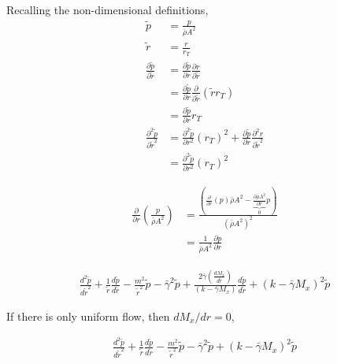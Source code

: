 \documentclass[a4paper]{report}
\begin{document}
Recalling the non-dimensional definitions,
\begin{align*}
    \tilde{p} &= \frac{p}{\bar{\rho} A^2} \\
    \tilde{r} &= \frac{r}{r_T} \\
    \frac{\partial \tilde{p}}{\partial \tilde{r}} &= 
    \frac{ \partial \tilde{p}}{\partial r} \frac{\partial r}{ \partial \tilde{r}}  \\ 
    &= \frac{ \partial \tilde{p}}{\partial r} \frac{\partial }{ \partial \tilde{r}} \left( \tilde{r} r_T \right) \\
    &= 
    \frac{ \partial \tilde{p}}{\partial r}  r_T \\
    \frac{\partial^2 \tilde{p}}{\partial \tilde{r}^2} &= 
    \frac{ \partial^2 \tilde{p}}{\partial r^2}  (r_T)^2+ 
    \frac{ \partial \tilde{p}}{\partial r} \frac{\partial^2 r}{ \partial \tilde{r}^2} \\
    &= \frac{ \partial^2 \tilde{p}}{\partial r^2}  (r_T)^2 
\end{align*}

\begin{align*}
    \frac{\partial}{\partial r} \left( \frac{p}{\bar{\rho} A^2} \right) 
    &=
    \frac{\left(\frac{\partial}{\partial r} \left(  p\right) \bar{\rho} A^2 - 
    \underbrace{\frac{\partial \bar{\rho}A^2}{\partial r}}_0 p \right)}{\left( \bar{\rho} A^2 \right)^2}\\ 
    &= \frac{1}{\bar{\rho}A^2} \frac{\partial p}{\partial r}
\end{align*}

\begin{align*}
    \frac{ d^2 \tilde{p}}{d \tilde{r}^2} +
    \frac{1}{\tilde{r}} 
    \frac{d \tilde{p}}{d \tilde{r}}- 
    \frac{m^2}{\tilde{r}^2}\tilde{p}- 
    \bar{\gamma}^2  \tilde{p}
 + 
    \frac{2 \bar{\gamma} \left( \frac{d M_x}{d \tilde{r}} \right)}
    {\left( k - \bar{\gamma} M_x \right)}\frac{d \tilde{p}}{d \tilde{r}}+
    \left( k - \bar{\gamma} M_x \right)^2\tilde{p} 
\end{align*}

If there is only uniform flow, then $dM_x/dr = 0$,

\begin{align*}
    \frac{ d^2 \tilde{p}}{d \tilde{r}^2} +
    \frac{1}{\tilde{r}} 
    \frac{d \tilde{p}}{d \tilde{r}}- 
    \frac{m^2}{\tilde{r}^2}\tilde{p}- 
    \bar{\gamma}^2  \tilde{p}
 + 
    \left( k - \bar{\gamma} M_x \right)^2\tilde{p} 
\end{align*}
\end{document}
